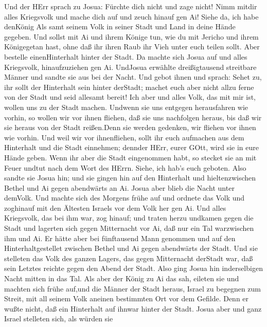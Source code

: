  Und der HErr sprach zu Josua: Fürchte dich nicht und zage
nicht! Nimm mitdir alles Kriegsvolk und mache dich auf und zeuch hinauf
gen Ai! Siehe da, ich habe denKönig Als samt seinem Volk in seiner Stadt
und Land in deine Hände gegeben.  Und sollst mit Ai und
ihrem Könige tun, wie du mit Jericho und ihrem Königegetan hast, ohne
daß ihr ihren Raub ihr Vieh unter euch teilen sollt. Aber bestelle
einenHinterhalt hinter der Stadt.  Da machte sich Josua auf
und alles Kriegsvolk, hinaufzuziehen gen Ai. UndJosua erwählte
dreißigtausend streitbare Männer und sandte sie aus bei der Nacht.
 Und gebot ihnen und sprach: Sehet zu, ihr sollt der
Hinterhalt sein hinter derStadt; machet euch aber nicht allzu ferne von
der Stadt und seid allesamt bereit!  Ich aber und alles
Volk, das mit mir ist, wollen uns zu der Stadt machen. Undwenn sie uns
entgegen herausfahren wie vorhin, so wollen wir vor ihnen fliehen,
 daß sie uns nachfolgen heraus, bis daß wir sie heraus von
der Stadt reißen.Denn sie werden gedenken, wir fliehen vor ihnen wie
vorhin. Und weil wir vor ihnenfliehen,  sollt ihr euch
aufmachen aus dem Hinterhalt und die Stadt einnehmen; dennder HErr,
eurer GOtt, wird sie in eure Hände geben.  Wenn ihr aber die
Stadt eingenommen habt, so stecket sie an mit Feuer undtut nach dem Wort
des HErrn. Siehe, ich hab's euch geboten.  Also sandte sie
Josua hin; und sie gingen hin auf den Hinterhalt und hieltenzwischen
Bethel und Ai gegen abendwärts an Ai. Josua aber blieb die Nacht unter
demVolk.  Und machte sich des Morgens frühe auf und ordnete
das Volk und zoghinauf mit den Ältesten Israels vor dem Volk her gen Ai.
 Und alles Kriegsvolk, das bei ihm war, zog hinauf; und
traten herzu undkamen gegen die Stadt und lagerten sich gegen
Mitternacht vor Ai, daß nur ein Tal warzwischen ihm und Ai.
 Er hätte aber bei fünftausend Mann genommen und auf den
Hinterhaltgestellet zwischen Bethel und Ai gegen abendwärts der Stadt.
 Und sie stelleten das Volk des ganzen Lagers, das gegen
Mitternacht derStadt war, daß sein Letztes reichte gegen den Abend der
Stadt. Also ging Josua hin inderselbigen Nacht mitten in das Tal.
 Als aber der König zu Ai das sah, eileten sie und machten
sich frühe auf,und die Männer der Stadt heraus, Israel zu begegnen zum
Streit, mit all seinem Volk aneinen bestimmten Ort vor dem Gefilde. Denn
er wußte nicht, daß ein Hinterhalt auf ihnwar hinter der Stadt.
 Josua aber und ganz Israel stelleten sich, als würden sie
